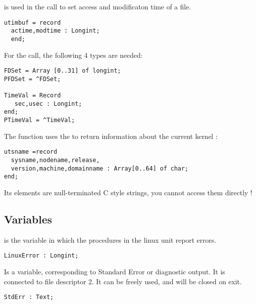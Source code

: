  is used in the  call to set access and modificaton time
of a file.
\begin{verbatim}
utimbuf = record
  actime,modtime : Longint;
  end;
\end{verbatim}
For the  call, the following 4 types are needed:
\begin{verbatim}
FDSet = Array [0..31] of longint;
PFDSet = ^FDSet;

TimeVal = Record
   sec,usec : Longint;
end;
PTimeVal = ^TimeVal;
\end{verbatim}
The  function uses the  to return information about
the current kernel :
\begin{verbatim}
utsname =record
  sysname,nodename,release,
  version,machine,domainname : Array[0..64] of char;
end;
\end{verbatim}
Its elements are null-terminated C style strings, you cannot access them
directly !

\subsection{Variables}
 is the variable in which the procedures in the linux unit
report errors.
\begin{verbatim}
LinuxError : Longint;
\end{verbatim}
 Is a  variable, corresponding to Standard Error or
diagnostic output. It is connected to file descriptor 2. It can be freely
used, and will be closed on exit.
\begin{verbatim}
StdErr : Text;
\end{verbatim}

